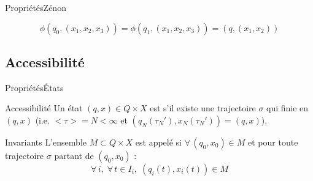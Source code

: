 \documentclass[compress]{beamer}
\begin{document}
\begin{frame}{Propriétés}{Zénon}
$$\phi(q_0, (x_1, x_2, x_3)) = \phi(q_1, (x_1, x_2, x_3)) = (q, (x_1, x_2))$$
\end{frame}

\subsection{Accessibilité}
\begin{frame}{Propriétés}{États}
\begin{block}{Accessibilité}
Un état $(q, x) \in Q \times X$ est  s'il existe une trajectoire  $\sigma$ qui finie en $(q, x)$ (i.e. $<\tau> = N < \infty$ et $(q_N(\tau_N'), x_N(\tau_N')) = (q, x)$).
\end{block}
\begin{block}{Invariants}
L'ensemble $M \subset Q \times X$ est appelé  si $\forall \, (q_0, x_0) \in M$ et pour toute trajectoire $\sigma$ partant de $(q_0, x_0)$ :
$$ \forall \, i, \; \forall \, t \in I_i, \; (q_i(t), x_i(t)) \in M$$
\end{block}
\end{frame}
\end{document}
